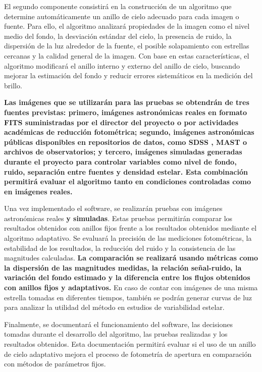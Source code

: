 \documentclass[9pt]{extarticle}
\begin{document}
El segundo componente consistirá en la construcción de un algoritmo que determine automáticamente un anillo de cielo adecuado para cada imagen o fuente. Para ello, el algoritmo analizará propiedades de la imagen como el nivel medio del fondo, la desviación estándar del cielo, la presencia de ruido, la dispersión de la luz alrededor de la fuente, el posible solapamiento con estrellas cercanas y la calidad general de la imagen. Con base en estas características, el algoritmo modificará el anillo interno y externo del anillo de cielo, buscando mejorar la estimación del fondo y reducir errores sistemáticos en la medición del brillo.

\textbf{Las imágenes que se utilizarán para las pruebas se obtendrán de tres fuentes previstas: primero, imágenes astronómicas reales en formato FITS suministradas por el director del proyecto o por actividades académicas de reducción fotométrica; segundo, imágenes astronómicas públicas disponibles en repositorios de datos, como SDSS \cite{abdurrouf2022sdss}, MAST o archivos de observatorios; y tercero, imágenes simuladas generadas durante el proyecto para controlar variables como nivel de fondo, ruido, separación entre fuentes y densidad estelar. Esta combinación permitirá evaluar el algoritmo tanto en condiciones controladas como en imágenes reales.}

Una vez implementado el software, se realizarán pruebas con imágenes astronómicas reales \textbf{y simuladas}. Estas pruebas permitirán comparar los resultados obtenidos con anillos fijos frente a los resultados obtenidos mediante el algoritmo adaptativo. Se evaluará la precisión de las mediciones fotométricas, la estabilidad de los resultados, la reducción del ruido y la consistencia de las magnitudes calculadas. \textbf{La comparación se realizará usando métricas como la dispersión de las magnitudes medidas, la relación señal-ruido, la variación del fondo estimado y la diferencia entre los flujos obtenidos con anillos fijos y adaptativos.} En caso de contar con imágenes de una misma estrella tomadas en diferentes tiempos, también se podrán generar curvas de luz para analizar la utilidad del método en estudios de variabilidad estelar.

Finalmente, se documentará el funcionamiento del software, las decisiones tomadas durante el desarrollo del algoritmo, las pruebas realizadas y los resultados obtenidos. Esta documentación permitirá evaluar si el uso de un anillo de cielo adaptativo mejora el proceso de fotometría de apertura en comparación con métodos de parámetros fijos.
\end{document}
